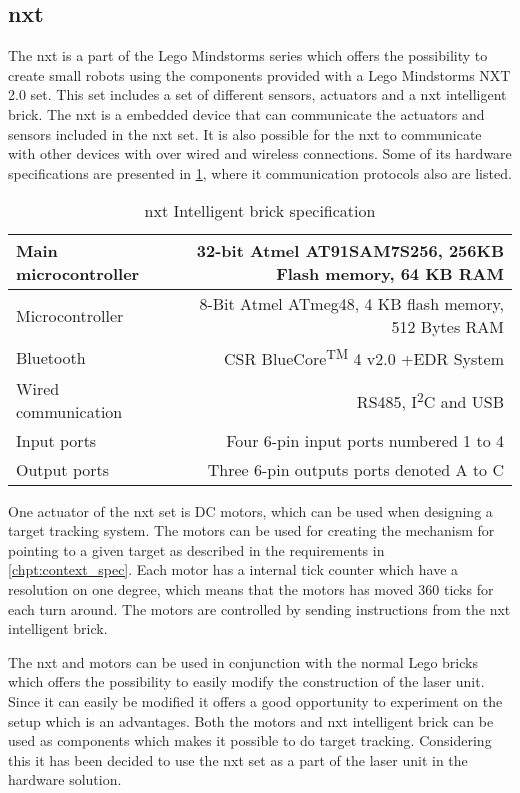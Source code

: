 \subsection{\acrlong{nxt}}\label{ss:nxt}
The \gls{nxt} is a part of the Lego Mindstorms series which offers the possibility to create small robots using the components provided with a Lego Mindstorms NXT 2.0 set\cite{lego_mindstorms}.  This set includes a set of different sensors, actuators and a \gls{nxt} intelligent brick. The \gls{nxt} is a embedded device that can communicate the actuators and sensors included in the \gls{nxt} set. It is also possible for the \gls{nxt} to communicate with other devices with over wired and wireless connections. Some of its hardware specifications are presented in \cref{tbl:nxt_spec}, where it communication protocols also are listed.

\begin{table}[ht]
  \centering
  \begin{tabular}{|l|r|}
  \hline
    Main microcontroller & 32-bit Atmel AT91SAM7S256, 256KB Flash memory, 64 KB RAM \\ \hline
    Microcontroller & 8-Bit Atmel ATmeg48, 4 KB flash memory, 512 Bytes RAM \\ \hline
    Bluetooth  & CSR BlueCore\textsuperscript{TM} 4 v2.0 +EDR System \\ \hline
    Wired communication  & RS485, I\textsuperscript{2}C and USB\\ \hline
    Input ports & Four 6-pin input ports numbered 1 to 4 \\ \hline
    Output ports & Three 6-pin outputs ports denoted A to C\\  \hline
  \end{tabular}
  \caption{\gls{nxt} Intelligent brick specification\cite{lego_hardware}}
  \label{tbl:nxt_spec}
\end{table}

One actuator of the \gls{nxt} set is DC motors\cite{lego_mindstorms}, which can be used when designing a target tracking system. The motors can be used for creating the mechanism for pointing to a given target as described in the requirements in \cref{chpt:context_spec}. Each motor has a internal tick counter which have a resolution on one degree, which means that the motors has moved 360 ticks for each turn around\cite{nxt_motor}. The motors are controlled by sending instructions from the \gls{nxt} intelligent brick.

The \gls{nxt} and motors can be used in conjunction with the normal Lego bricks which offers the possibility to easily modify the construction of the laser unit. Since it can easily be modified it offers a good opportunity to experiment on the setup which is an advantages. Both the motors and \gls{nxt} intelligent brick can be used as components which makes it possible to do target tracking. Considering this it has been decided to use the \gls{nxt} set as a part of the laser unit in the hardware solution.
